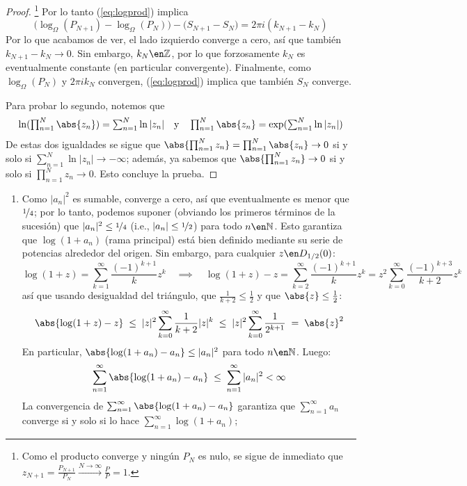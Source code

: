 \begin{sol}
\begin{lema}
\begin{proof}
\footnote{
    Como el producto converge y ningún $P_N$ es nulo, se sigue de inmediato que $z_{N+1} = \frac{P_{N+1}}{P_N} \xrightarrow{N\to \infty} \frac{P}{P} = 1$.
}
Por lo tanto (\ref{eq:logprod}) implica
\[
\big(\log_\Omega(P_{N+1}) - \log_\Omega(P_{N})\big) - \big(S_{N+1}-S_N\big) = 2\pi i(k_{N+1} - k_N)
\]
Por lo que acabamos de ver, el lado izquierdo converge a cero, así que también $k_{N+1}-k_N \to 0$. Sin embargo, $k_N\en\mathbb Z$, por lo que forzosamente $k_N$ es eventualmente constante (en particular convergente). Finalmente, como $\log_\Omega(P_N)$ y $2\pi i k_N$ convergen, (\ref{eq:logprod}) implica que también $S_N$ converge.\par
Para probar lo segundo, notemos que
\[\textstyle
\ln(\prod^N_{n=1}\abs{z_n}) = \sum^N_{n=1}\ln{|z_n|}
\quad\text{y}\quad
\prod^N_{n=1}\abs{z_n} = \exp(\sum^N_{n=1}\ln{|z_n|})
\]
De estas dos igualdades se sigue que $\abs{\prod^N_{n=1}z_n}=\prod^N_{n=1}\abs{z_n} \to 0$ si y solo si $\sum^N_{n=1}\ln{|z_n|} \to -\infty$; además, ya sabemos que $\abs{\prod^N_{n=1}z_n} \to 0$ si y solo si $\prod^N_{n=1}z_n \to 0$. Esto concluye la prueba.
\end{proof}
\end{lema}
\begin{enumerate}[label=(\alph*), leftmargin=1.5em]
\item %
Como $|a_n|^2$ es sumable, converge a cero, así que eventualmente es menor que $\nicefrac{1}{4}$; por lo tanto, podemos suponer (obviando los primeros términos de la sucesión) que $|a_n|^2 \leq \nicefrac{1}{4}$ (i.e., $|a_n| \leq \nicefrac{1}{2}$) para todo $n\en\mathbb N$. Esto garantiza que $\log(1+a_n)$ (rama principal) está bien definido mediante su serie de potencias alrededor del origen. Sin embargo, para cualquier $z\en D_{1/2}(0)$:
\[
\log(1+z) 
= \sum^\infty_{k=1}\frac{(-1)^{k+1}}{k}z^k
\quad\implies\quad
\log(1+z) - z 
= \sum^\infty_{k=2}\frac{(-1)^{k+1}}{k}z^k
= z^2\sum^\infty_{k=0}\frac{(-1)^{k+3}}{k+2}z^k
\]
así que usando desigualdad del triángulo, que $\frac{1}{k+2} \le \frac{1}{2}$ y que $\abs{z}\le \frac{1}{2}$:
\[
\abs{\log(1+z) - z}
\;\leq\; |z|^2\sum^\infty_{k=0}\frac{1}{k+2}|z|^k
\;\leq\; |z|^2\sum^\infty_{k=0}\frac{1}{2^{k+1}} 
\;=\; \abs{z}^2
\]
En particular, $\abs{\log(1+a_n)-a_n} \le |a_n|^2$ para todo $n\en\mathbb N$. Luego:
\[
\sum^\infty_{n=1} \abs{\log(1+a_n) - a_n} 
\;\leq\; \sum^\infty_{n=1}|a_n|^2 <\infty
\]
La convergencia de $\sum^\infty_{n=1} \abs{\log(1+a_n) - a_n}$ garantiza que $\sum^\infty_{n=1}a_n$ converge si y solo si lo hace $\sum^\infty_{n=1}\log(1+a_n)$;%

\end{enumerate}
\end{sol}
